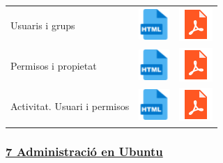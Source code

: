 \documentclass[
  12 pt,
  a4paper,
]{article}
\begin{document}
\begin{longtable}[]{@{}
  >{\raggedright\arraybackslash}p{}
  >{\raggedright\arraybackslash}p{}
  >{\raggedright\arraybackslash}p{}@{}}
\toprule\noalign{}
\endhead
\bottomrule\noalign{}
\endlastfoot
Usuaris i grups &
\href{U6-TASQUES_BÀSIQUES_AMB_UBUNTU/U6-COMPTES_LOCALS_UBUNTU.html}{\includegraphics{recursos/iconohtml.png}}
&
\href{U6-TASQUES_BÀSIQUES_AMB_UBUNTU/U6-COMPTES_LOCALS_UBUNTU.pdf}{\includegraphics{recursos/iconopdf.png}} \\
Permisos i propietat &
\href{U6-TASQUES_BÀSIQUES_AMB_UBUNTU/U6-PERMISOS_I_PROPIETAT.html}{\includegraphics{recursos/iconohtml.png}}
&
\href{U6-TASQUES_BÀSIQUES_AMB_UBUNTU/U6-PERMISOS_I_\%20PROPIETAT.pdf}{\includegraphics{recursos/iconopdf.png}} \\
Activitat. Usuari i permisos &
\href{U6-TASQUES_BÀSIQUES_AMB_UBUNTU/ActivitatPermisosBotiga.html}{\includegraphics{recursos/iconohtml.png}}
&
\href{U6-TASQUES_BÀSIQUES_AMB_UBUNTU/ActivitatPermisosBotiga.pdf}{\includegraphics{recursos/iconopdf.png}} \\
\end{longtable}

\subsubsection{\texorpdfstring{\hyperref[U7]{7 Administració en
Ubuntu}}{7 Administració en Ubuntu}}\label{administraciuxf3-en-ubuntu}
\end{document}
